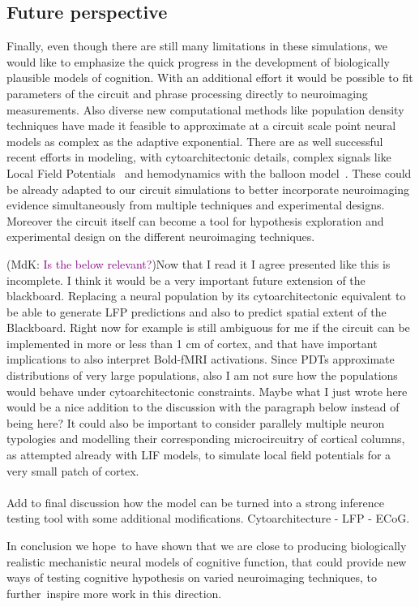 \documentclass[10pt]{article}
\newcommand{\noteMdK}[2]{(MdK: \textcolor{purple}{#1})}
\newcommand{\notenewMP}[3]{(MP: \textcolor{blue}{#1})}
\begin{document}
\subsection{Future perspective}






Finally, even though there are still many limitations in these simulations, we would like to emphasize the quick progress in the development of biologically plausible models of cognition.
With an additional effort it would be possible to fit parameters of the circuit and phrase processing directly to neuroimaging measurements.
Also diverse new computational methods like population density techniques have made it feasible to approximate at a circuit scale point neural models as complex as the adaptive exponential.
There are as well successful recent efforts in modeling, with cytoarchitectonic details, complex signals like Local Field Potentials~\cite{Mazzoni_2015,Hagen_2015} and hemodynamics with the balloon model~\cite{Buxton_2004}.
These could be already adapted to our circuit simulations to better incorporate neuroimaging evidence simultaneously from multiple techniques and experimental designs.
Moreover the circuit itself can become a tool for hypothesis exploration and experimental design on the different neuroimaging techniques.


\noteMdK{Is the below relevant?} 
\notenewMP{Now that I read it I agree presented like this is incomplete. I think it would be a very important future extension of the blackboard. Replacing a neural population by its cytoarchitectonic equivalent to be able to generate LFP predictions and also to predict spatial extent of the Blackboard. Right now for example is still ambiguous for me if the circuit can be implemented in more or less than 1 cm of cortex, and that have important implications to also interpret Bold-fMRI activations. Since PDTs approximate distributions of very large populations, also I am not sure how the populations would behave under cytoarchitectonic constraints. Maybe what I just wrote here would be a nice addition to the discussion with the paragraph below instead of being here?} 
It could also be important to consider parallely multiple neuron typologies and modelling their corresponding microcircuitry of cortical columns, as attempted already with LIF models, to simulate local field potentials for a very small patch of cortex\cite{Mazzoni_2015,Hagen_2015}.\\~\\


Add to final discussion how the model can be turned into a strong inference testing tool with some additional modifications. Cytoarchitecture - LFP - ECoG.


In conclusion we hope~to have shown that we are close to producing biologically realistic mechanistic neural models of cognitive function, that could provide new ways of testing cognitive hypothesis on varied neuroimaging techniques, to further~inspire more work in this direction.




\end{document}

